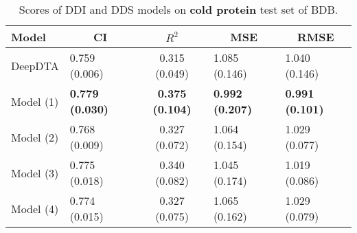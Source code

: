 \begin{table}[H]
\centering
\caption{Scores of DDI and DDS models on \textbf{cold protein} test set of BDB.}
\label{tab:ddi_ci_r2}
\begin{tabular}{|l|l|c|l|l|} 
\hline
Model & \multicolumn{1}{c|}{CI} & $R^2$ & \multicolumn{1}{c|}{MSE} & \multicolumn{1}{c|}{RMSE} \\ 
\hline
DeepDTA & 0.759 (0.006) & 0.315 (0.049) & 1.085 (0.146) & 1.040 (0.146) \\ 
\hline
Model (1) & \textbf{0.779 (0.030)} & \textbf{0.375 (0.104)} & \textbf{0.992 (0.207)} & \textbf{0.991 (0.101)} \\ 
\hline
Model (2) & 0.768 (0.009) & 0.327 (0.072) & 1.064 (0.154) & 1.029 (0.077) \\ 
\hline
Model (3) & 0.775 (0.018) & 0.340 (0.082) & 1.045 (0.174) & 1.019 (0.086) \\ 
\hline
Model (4) & 0.774 (0.015) & 0.327 (0.075) & 1.065 (0.162) & 1.029 (0.079) \\
\hline
\end{tabular}
\label{tab:ddi_vs_dds_cold_prot}
\end{table}